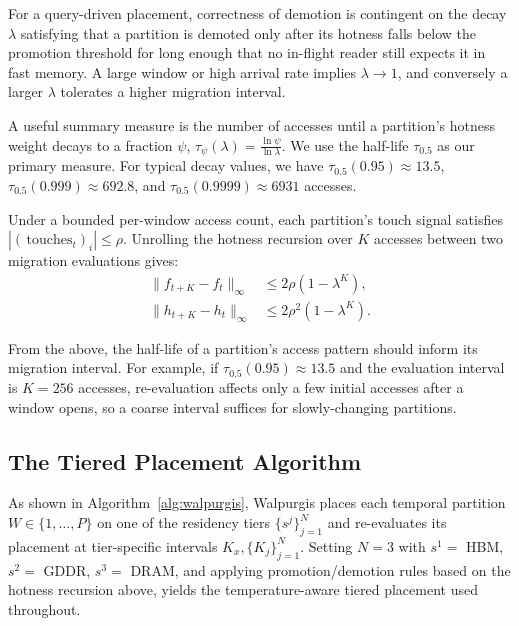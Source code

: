 \documentclass{article}
\begin{document}
For a query-driven placement, correctness of demotion is contingent on the decay
$\lambda$ satisfying that a partition is demoted only after its hotness falls below the
promotion threshold for long enough that no in-flight reader still expects it in fast
memory. A large window or high arrival rate implies $\lambda \to 1$, and conversely a
larger $\lambda$ tolerates a higher migration interval.

A useful summary measure is the number of accesses until a partition's hotness weight
decays to a fraction $\psi$, $\tau_\psi(\lambda) = \frac{\ln \psi}{\ln \lambda}$. We use
the half-life $\tau_{0.5}$ as our primary measure. For typical decay values, we have
$\tau_{0.5}(0.95) \approx 13.5$, $\tau_{0.5}(0.999) \approx 692.8$, and
$\tau_{0.5}(0.9999) \approx 6931$ accesses.

Under a bounded per-window access count, each partition's touch signal satisfies
$|(\,\text{touches}_t)_i| \leq \rho$. Unrolling the hotness recursion over $K$ accesses
between two migration evaluations gives:
\begin{align}
\|f_{t+K} - f_t\|_\infty &\leq 2\rho(1 - \lambda^K), \label{eq:drift_f}\\
\|h_{t+K} - h_t\|_\infty &\leq 2\rho^2(1 - \lambda^K). \label{eq:drift_h}
\end{align}

From the above, the half-life of a partition's access pattern should inform its
migration interval. For example, if $\tau_{0.5}(0.95) \approx 13.5$ and the evaluation
interval is $K = 256$ accesses, re-evaluation affects only a few initial accesses after
a window opens, so a coarse interval suffices for slowly-changing partitions.

\subsection{The Tiered Placement Algorithm}
\label{sec:system_algorithm}

As shown in Algorithm~\ref{alg:walpurgis}, Walpurgis places each temporal partition
$W \in \{1,\dots,P\}$ on one of the residency tiers $\{s^j\}_{j=1}^N$ and re-evaluates
its placement at tier-specific intervals $K_x, \{K_j\}_{j=1}^N$. Setting $N = 3$ with
$s^1 = $ HBM, $s^2 = $ GDDR, $s^3 = $ DRAM, and applying promotion/demotion rules based
on the hotness recursion above, yields the temperature-aware tiered placement used
throughout.
\end{document}
